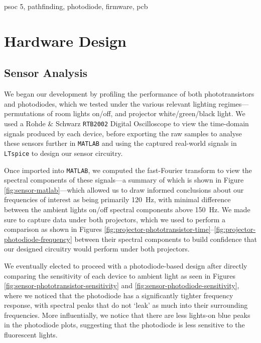 \documentclass[conference]{IEEEtran}
\begin{document}
\begin{IEEEkeywords}
	psoc 5, pathfinding, photodiode, firmware, pcb
\end{IEEEkeywords}



\section{Hardware Design}

\subsection{Sensor Analysis}

We began our development by profiling the performance of both phototransistors and photodiodes, which we tested under the various relevant lighting regimes—permutations of room lights on/off, and projector white/green/black light.
We used a Rohde \& Schwarz \texttt{RTB2002} Digital Oscilloscope to view the time-domain signals produced by each device, before exporting the raw samples to analyse these sensors further in \texttt{MATLAB} and using the captured real-world signals in \texttt{LTspice} to design our sensor circuitry.

Once imported into \texttt{MATLAB}, we computed the fast-Fourier transform to view the spectral components of these signals—a summary of which is shown in Figure \ref{fig:sensor-matlab}—which allowed us to draw informed conclusions about our frequencies of interest as being primarily \qty{120}{\hertz}, with minimal difference between the ambient lights on/off spectral components above \qty{150}{\hertz}.
We made sure to capture data under both projectors, which we used to perform a comparison as shown in Figures \ref{fig:projector-phototransistor-time}–\ref{fig:projector-photodiode-frequency} between their spectral components to build confidence that our designed circuitry would perform under both projectors.

We eventually elected to proceed with a photodiode-based design after directly comparing the sensitivity of each device to ambient light as seen in Figures \ref{fig:sensor-phototransistor-sensitivity} and \ref{fig:sensor-photodiode-sensitivity}, where we noticed that the photodiode has a significantly tighter frequency response, with spectral peaks that do not `leak' as much into their surrounding frequencies.
More influentially, we notice that there are less lights-on blue peaks in the photodiode plots, suggesting that the photodiode is less sensitive to the fluorescent lights.
\end{document}
